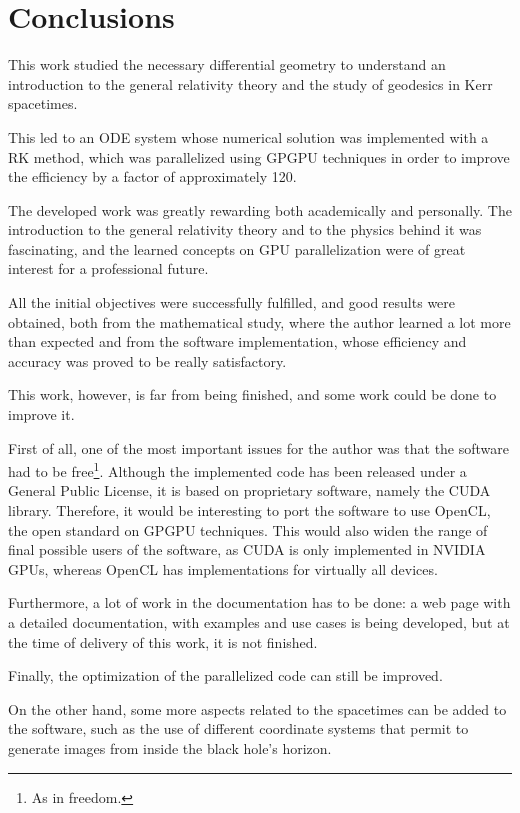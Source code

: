 \chapter*{Conclusions}

This work studied the necessary differential geometry to understand an introduction to the general relativity theory and the study of geodesics in Kerr spacetimes.

This led to an \ac{ODE} system whose numerical solution was implemented with a \ac{RK} method, which was parallelized using \ac{GPGPU} techniques in order to improve the efficiency by a factor of approximately 120.

The developed work was greatly rewarding both academically and personally. The introduction to the general relativity theory and to the physics behind it was fascinating, and the learned concepts on \ac{GPU} parallelization were of great interest for a professional future.

All the initial objectives were successfully fulfilled, and good results were obtained, both from the mathematical study, where the author learned a lot more than expected and from the software implementation, whose efficiency and accuracy was proved to be really satisfactory.

This work, however, is far from being finished, and some work could be done to improve it.

First of all, one of the most important issues for the author was that the software had to be free\footnote{As in freedom.}. Although the implemented code has been released under a General Public License, it is based on proprietary software, namely the \ac{CUDA} library. Therefore, it would be interesting to port the software to use OpenCL, the open standard on \ac{GPGPU} techniques. This would also widen the range of final possible users of the software, as \ac{CUDA} is only implemented in NVIDIA \acp{GPU}, whereas OpenCL has implementations for virtually all devices.

Furthermore, a lot of work in the documentation has to be done: a web page with a detailed documentation, with examples and use cases is being developed, but at the time of delivery of this work, it is not finished.

Finally, the optimization of the parallelized code can still be improved.

On the other hand, some more aspects related to the spacetimes can be added to the software, such as the use of different coordinate systems that permit to generate images from inside the black hole's horizon.
